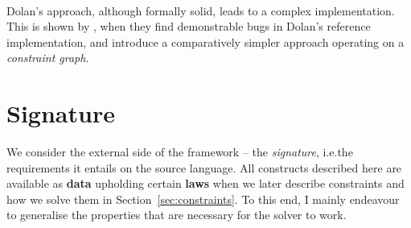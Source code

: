\paragraph{\simplesub{}} 
Dolan's approach, although formally solid, leads to a complex implementation. This is shown by \textcite{simple-sub}, when they find demonstrable bugs in Dolan's reference implementation, and introduce a comparatively simpler approach operating on a \emph{constraint graph}. 

\color{black}

\section{Signature}
\label{sec:signature}

We consider the external side of the \inference{} framework -- the \emph{signature}, i.e.\@ the requirements it entails on the source language. 
All constructs described here are available as \textbf{data} upholding certain \textbf{laws} when we later describe constraints and how we solve them in Section~\ref{sec:constraints}. To this end, I mainly endeavour to generalise the properties that are necessary for the \mlstruct{} solver to work.

